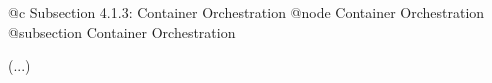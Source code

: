 @c Subsection 4.1.3: Container Orchestration
@node Container Orchestration
@subsection Container Orchestration

(...)
